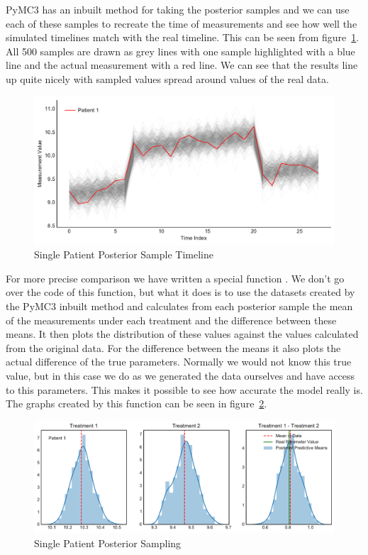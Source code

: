 \documentclass[12pt,a4paper,leqno]{report}
\theoremstyle{plain}
\theoremstyle{definition}
\theoremstyle{remark}
\begin{document}
PyMC3 has an inbuilt method for taking the posterior samples and we can use each of
these samples to recreate the time of measurements and see how well the simulated
timelines match with the real timeline. This can be seen from figure\ \ref{singlepatientposteriortimeline}.
All 500 samples are drawn as grey lines with one sample highlighted with a blue line and
the actual measurement with a red line. We can see that the results line up quite
nicely with sampled values spread around values of the real data.

\bigskip
\begin{figure}[H]
    \caption{Single Patient Posterior Sample Timeline}\label{singlepatientposteriortimeline}
    \bigskip
    \includegraphics[width=\textwidth,height=\textheight,keepaspectratio]{posterior_sample_timeline_single_patient.pdf}
\end{figure}
\bigskip

For more precise comparison we have written a special function
. We don't go over the code of this function,
but what it does is to use the datasets created by the PyMC3 inbuilt method and
calculates from each posterior sample the mean of the measurements under each treatment and the difference between
these means. It then plots the distribution of these values
against the values calculated from the
original data. For the difference between the means it also plots the actual
difference of the true parameters. Normally we would not know
this true value, but in this case we do as we generated the data ourselves and have
access to this parameters. This
makes it possible to see how accurate the model really is. The graphs created by this
function can be seen in figure\ \ref{singlepatientposteriorsampling}.

\bigskip
\begin{figure}[H]
    \caption{Single Patient Posterior Sampling}\label{singlepatientposteriorsampling}
    \bigskip
    \includegraphics[width=\textwidth,height=\textheight,keepaspectratio]{single_patient_posterior_sampling.pdf}
\end{figure}
\bigskip
\end{document}

